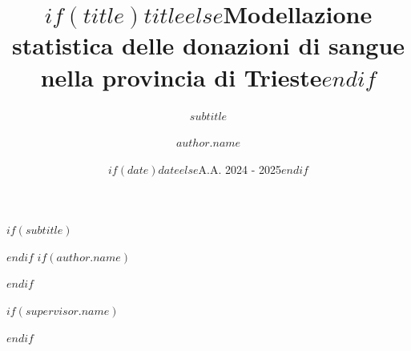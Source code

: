 \title{$if(title)$$title$$else$Modellazione statistica delle donazioni di sangue nella provincia di Trieste$endif$}
$if(subtitle)$\subtitle{$subtitle$}$endif$
$if(author.name)$\author{$author.name$}$endif$
\date{$if(date)$$date$$else$A.A. 2024 - 2025$endif$}
$if(supervisor.name)$\publishers{$supervisor.role$: $supervisor.name$}$endif$

\newcommand{\ThesisTitle}{$if(title)$$title$$else$Modellazione statistica delle donazioni di sangue nella provincia di Trieste$endif$}
\newcommand{\ThesisSubtitle}{$if(subtitle)$$subtitle$$else$$endif$}
\newcommand{\ThesisAuthor}{Erik De Luca} %
\newcommand{\ThesisSupervisor}{$if(supervisor.name)$$supervisor.name$$else$Prof.\ Leonardo Egidi$endif$}
\newcommand{\AcademicYear}{A.A.\ 2024--2025}
